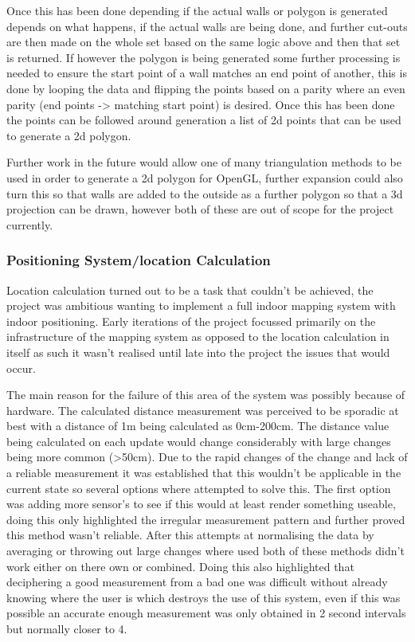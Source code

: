 Once this has been done depending if the actual walls or polygon is generated depends on what happens, if the actual walls are being done, and further cut-outs are then made on the whole set based on the same logic above and then that set is returned. If however the polygon is being generated some further processing is needed to ensure the start point of a wall matches an end point of another, this is done by looping the data and flipping the points based on a parity where an even parity (end points -> matching start point) is desired. Once this has been done the points can be followed around generation a list of 2d points that can be used to generate a 2d polygon.

Further work in the future would allow one of many triangulation methods to be used in order to generate a 2d polygon for OpenGL, further expansion could also turn this so that walls are added to the outside as a further polygon so that a 3d projection can be drawn, however both of these are out of scope for the project currently.


\subsubsection{Positioning System/location Calculation}
Location calculation turned out to be a task that couldn't be achieved, the project was ambitious wanting to implement a full indoor mapping system with indoor positioning. Early iterations of the project focussed primarily on the infrastructure of the mapping system as opposed to the location calculation in itself as such it wasn't realised until late into the project the issues that would occur.

The main reason for the failure of this area of the system was possibly because of hardware. The calculated distance measurement was perceived to be sporadic at best with a distance of 1m being calculated as 0cm-200cm. The distance value being calculated on each update would change considerably with large changes being more common (>50cm). Due to the rapid changes of the change and lack of a reliable measurement it was established that this wouldn't be applicable in the current state so several options where attempted to solve this. The first option was adding more sensor's to see if this would at least render something useable, doing this only highlighted the irregular measurement pattern and further proved this method wasn't reliable.
After this attempts at normalising the data by averaging or throwing out large changes where used both of these methods didn't work either on there own or combined. Doing this also highlighted that deciphering a good measurement from a bad one was difficult without already knowing where the user is which destroys the use of this system, even if this was possible an accurate enough measurement was only obtained in 2 second intervals but normally closer to 4.

